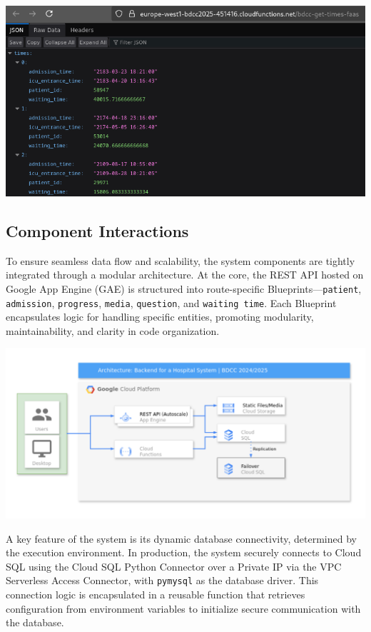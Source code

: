 \begin{multicols}{2}
\begin{itemize}
    \includegraphics[width=\linewidth]{img/faas.png}
    
    
\end{itemize}

\subsection{Component Interactions}

To ensure seamless data flow and scalability, the system components are tightly integrated through a modular architecture. At the core, the REST API hosted on Google App Engine (GAE) is structured into route-specific Blueprints—\texttt{patient}, \texttt{admission}, \texttt{progress}, \texttt{media}, \texttt{question}, and \texttt{waiting time}. Each Blueprint encapsulates logic for handling specific entities, promoting modularity, maintainability, and clarity in code organization.

\includegraphics[width=\linewidth]{img/design.png}

A key feature of the system is its dynamic database connectivity, determined by the execution environment. In production, the system securely connects to Cloud SQL using the Cloud SQL Python Connector over a Private IP via the VPC Serverless Access Connector, with \texttt{pymysql} as the database driver. This connection logic is encapsulated in a reusable function that retrieves configuration from environment variables to initialize secure communication with the database.


\end{multicols}